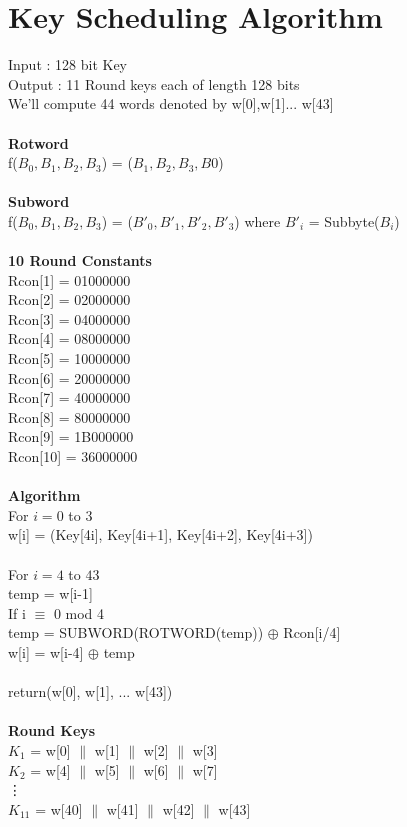 \documentclass[11pt]{article}
\begin{document}
\section*{Key Scheduling Algorithm}
Input : 128 bit Key \\
Output : 11 Round keys each of length 128 bits \\
We'll compute 44 words denoted by w[0],w[1]... w[43] \\\\
\textbf{Rotword}\\
f($B_{0},B_{1},B_{2},B_{3}$) = ($B_{1},B_{2},B_{3},B{0}$) \\\\
\textbf{Subword}\\
f($B_{0},B_{1},B_{2},B_{3}$) = ($B'_{0},B'_{1},B'_{2},B'_{3}$) where $B'_{i}$ = Subbyte($B_{i}$) \\\\
\textbf{10 Round Constants }\\
Rcon[1] = 01000000 \\
Rcon[2] = 02000000 \\
Rcon[3] = 04000000 \\
Rcon[4] = 08000000 \\
Rcon[5] = 10000000 \\
Rcon[6] = 20000000 \\
Rcon[7] = 40000000 \\
Rcon[8] = 80000000 \\
Rcon[9] = 1B000000 \\
Rcon[10] = 36000000 \\
\\
\textbf{Algorithm}\\
For $i=0$ to $3$ \\
\hspace*{0.50cm} w[i] = (Key[4i], Key[4i+1], Key[4i+2], Key[4i+3]) \\\\
For $i=4$ to $43$ \\
\hspace*{0.50cm} temp = w[i-1] \\
\hspace*{0.50cm} If i $\equiv$ 0 mod 4 \\
\hspace*{1cm} temp = SUBWORD(ROTWORD(temp)) $\oplus$ Rcon[i/4] \\
\hspace*{0.50cm} w[i] = w[i-4] $\oplus$ temp  \\\\
return(w[0], w[1], ... w[43]) \\
\\
\textbf{Round Keys}\\
$K_{1}$ = w[0] $\|$ w[1] $\|$ w[2] $\|$ w[3] \\
$K_{2}$ = w[4] $\|$ w[5] $\|$ w[6] $\|$ w[7]  \\
\vdots \\
$K_{11}$ = w[40] $\|$ w[41] $\|$ w[42] $\|$ w[43] \\
\end{document}
